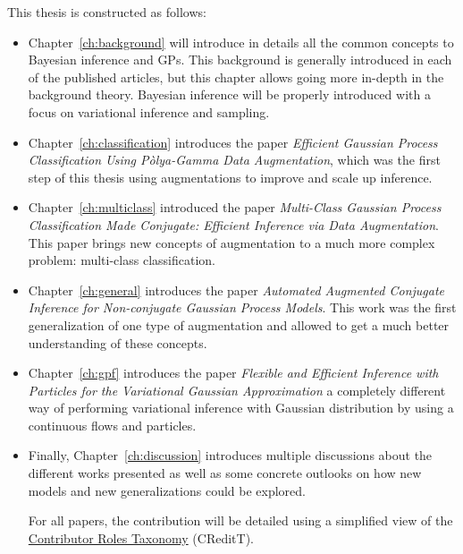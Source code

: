 This thesis is constructed as follows:
\begin{itemize}
    \item Chapter~\ref{ch:background} will introduce in details all the common concepts to Bayesian inference and \ac{GPs}.
          This background is generally introduced in each of the published articles, but this chapter allows going more in-depth in the background theory.
          Bayesian inference will be properly introduced with a focus on variational inference and sampling.
    \item Chapter~\ref{ch:classification} introduces the paper \textit{Efficient Gaussian Process Classification Using P\`olya-Gamma Data Augmentation}, which was the first step of this thesis using augmentations to improve and scale up inference.
    \item Chapter~\ref{ch:multiclass} introduced the paper \textit{Multi-Class Gaussian Process Classification Made Conjugate: Efficient Inference via Data Augmentation}.
          This paper brings new concepts of augmentation to a much more complex problem: multi-class classification.
    \item Chapter~\ref{ch:general} introduces the paper \textit{Automated Augmented Conjugate Inference for Non-conjugate Gaussian Process Models}.
          This work was the first generalization of one type of augmentation and allowed to get a much better understanding of these concepts.
    \item Chapter~\ref{ch:gpf} introduces the paper \textit{Flexible and Efficient Inference with Particles for the Variational Gaussian Approximation } a completely different way of performing variational inference with Gaussian distribution by using a continuous flows and particles.
    \item Finally, Chapter~\ref{ch:discussion} introduces multiple discussions about the different works presented as well as some concrete outlooks on how new models and new generalizations could be explored.

    For all papers, the contribution will be detailed using a simplified view of the \href{https://mdpi-res.com/data/contributor-role-instruction.pdf}{Contributor Roles Taxonomy} (CReditT).

\end{itemize}

